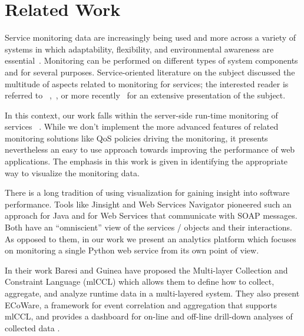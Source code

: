 
\section{Related Work}
\label{sec:related}

Service monitoring data are increasingly being used and more across a variety of systems in which adaptability, flexibility, and environmental awareness are essential~\cite{pernici2016monitoring}. Monitoring can be performed on different types of system components and for several purposes. Service-oriented literature on the subject discussed the multitude of aspects related to monitoring for services; the interested reader is referred to ~\cite{ghezzi2007run},~\cite{metzger2010analytical}, or more recently~\cite{pernici2016monitoring} for an extensive presentation of the subject. 

In this context, our work falls within the server-side run-time monitoring of services ~\cite{ghezzi2007run}. While we don't implement the more advanced features of related monitoring solutions like QoS policies driving the monitoring, it presents nevertheless an easy to use approach towards improving the performance of web applications. The emphasis in this work is given in identifying the appropriate way to visualize the monitoring data.
  
There is a long tradition of using visualization for gaining insight into software performance. Tools like Jinsight \cite{Pauw02a} and Web Services Navigator \cite{Pauw05} pioneered such an approach for Java and for Web Services that communicate with SOAP messages. Both have an ``omniscient'' view of the services / objects and their interactions. As opposed to them, in our work we present an analytics platform which focuses on monitoring a single Python web service from its own point of view.


In their work Baresi and Guinea have proposed the Multi-layer Collection and Constraint Language (mlCCL) which allows them to define how to collect, aggregate, and analyze runtime data in a multi-layered system. They also present ECoWare, a framework for event correlation and aggregation that supports mlCCL, and provides a dashboard for on-line and off-line drill-down analyses of collected data \cite{Bare13-monitoring}.



